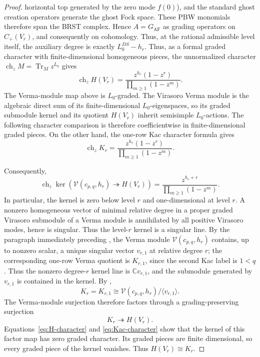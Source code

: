 \documentclass[12pt,leqno]{amsart}
\numberwithin{equation}{section}
\newcommand{\ch}{\operatorname{ch}}
\def\C{\mathbb{C}}
\begin{document}
\begin{proof}
horizontal top generated by the zero mode $f(0)$), and the standard ghost
creation operators generate the ghost Fock space.  These PBW monomials
therefore span the BRST complex.  Hence
$A=G_{\mathrm{AF}}$ as grading operators on $C_+(V_r)$, and consequently on
cohomology.  Thus, at the rational admissible level itself, the auxiliary
degree is exactly $L^{DS}_0-h_r$.  Thus, as a formal graded
character with finite-dimensional homogeneous pieces, the unnormalized
character $\ch_zM=\operatorname{Tr}_M z^{L_0}$ gives
\begin{equation}\label{eq:H-character}
 \ch_z H(V_r)=
 \frac{z^{h_r}(1-z^r)}{\prod_{m\ge1}(1-z^m)}.
\end{equation}
The Verma-module map above is $L_0$-graded.  The Virasoro Verma module is
the algebraic direct sum of its finite-dimensional $L_0$-eigenspaces, so
its graded submodule kernel and its quotient $H(V_r)$ inherit semisimple
$L_0$-actions.  The following character comparison is therefore
coefficientwise in finite-dimensional graded pieces.
On the other hand, the one-row Kac character formula
\cite[Remark~2.2]{McRaeSopin} gives
\begin{equation}\label{eq:Kac-character}
 \ch_z K_r=
 \frac{z^{h_r}(1-z^r)}{\prod_{m\ge1}(1-z^m)}.
\end{equation}

Consequently,
\[
 \ch_z\ker\!\left(\mathcal V(c_{p,q},h_r)
 \twoheadrightarrow H(V_r)\right)
 =\frac{z^{h_r+r}}{\prod_{m\ge1}(1-z^m)}.
\]
In particular, the kernel is zero below level $r$ and one-dimensional at
level $r$.  A nonzero homogeneous vector of minimal relative degree in a proper
graded Virasoro submodule of a Verma module is annihilated by all positive
Virasoro modes, hence is singular.  Thus the level-$r$ kernel is a
singular line.  By the paragraph immediately preceding
\cite[Theorem~4.3]{McRaeSopin}, the Verma module
$\mathcal V(c_{p,q},h_r)$ contains, up to nonzero scalar, a unique singular
vector $v_{r,1}$ at relative degree $r$; the corresponding one-row Verma
quotient is $K_{r,1}$, since the second Kac label is $1<q$.
Thus the nonzero degree-$r$ kernel line is $\C v_{r,1}$, and the submodule
generated by $v_{r,1}$ is contained in the kernel.  By
\cite[Remark~2.2]{McRaeSopin},
\[
 K_r=K_{r,1}\cong
 \mathcal V(c_{p,q},h_r)/\langle v_{r,1}\rangle.
\]
The Verma-module surjection therefore factors through a grading-preserving
surjection
\[
 K_r\twoheadrightarrow H(V_r).
\]
Equations~\eqref{eq:H-character} and \eqref{eq:Kac-character} show that the
kernel of this factor map has zero graded character.  Its graded pieces are
finite dimensional, so every graded piece of the kernel vanishes.  Thus
$H(V_r)\cong K_r$.
\end{proof}
\end{document}
